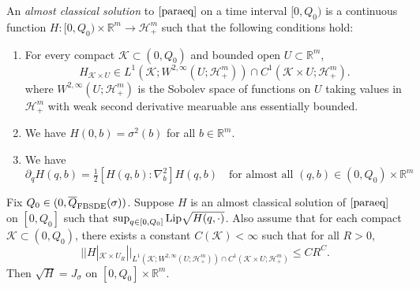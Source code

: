\begin{definition}
    An \emph{almost classical solution} to $\eqref{paraeq}$ on a time interval $[0,Q_0)$ is a continuous function $H:[0,Q_0)\times\mathbb{R}^m \to \mathcal{H}_+^m$ such that the following conditions hold:
    \begin{enumerate}
        \item For every compact $\mathcal{K}\subset (0,Q_0)$ and bounded open $U \subset \mathbb{R}^m$,
        \[
        H_{\mathcal{K}\times U} \in L^1(\mathcal{K};W^{2,\infty}(U;\mathcal{H}_+^m)) \cap C^1(\mathcal{K}\times U ;\mathcal{H}^m_+).
        \]
        where $W^{2,\infty}(U;\mathcal{H}^m_+)$ is the Sobolev space of functions on $U$ taking values in $\mathcal{H}_+^m$ with weak second derivative mearuable ans essentially bounded.
        \item We have $H(0,b) = \sigma^2(b)$ for all $b\in\mathbb{R}^m$.
        \item We have \[
            \partial_q H(q,b) = \tfrac{1}{2}[H(q,b):\nabla^2_b]H(q,b)\quad\text{for almost all }(q,b)\in(0,Q_0)\times\mathbb{R}^m
        \]
    \end{enumerate}
\end{definition}

\begin{proposition}
    Fix $Q_0 \in (0,\overline{Q}_{\text{FBSDE}}(\sigma))$. Suppose $H$ is an almost classical solution of $\eqref{paraeq}$ on $[0, Q_0]$ such that $\sup_{q\in[0,Q_0]}\text{Lip}\sqrt{H(q,\cdot)}$. Also assume that for each compact $\mathcal{K} \subset (0,Q_0)$, there
exists a constant $C(\mathcal{K}) < \infty$ such that for all $R > 0$,
\[||H|_{\mathcal{K}\times U_R}||_{ L^1(\mathcal{K};W^{2,\infty}(U;\mathcal{H}_+^m)) \cap C^1(\mathcal{K}\times U ;\mathcal{H}^m_+)} \leq CR^C.\]
Then $\sqrt{H} = J_{\sigma}$ on $[0,Q_0] \times\mathbb{R}^m$.
\end{proposition}

